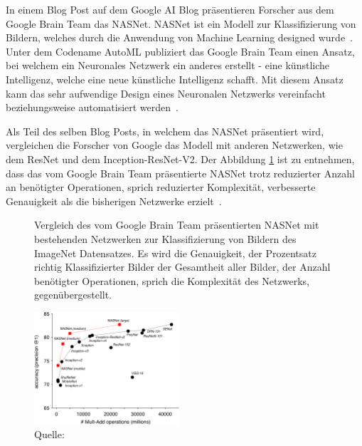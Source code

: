 In einem Blog Post auf dem Google AI Blog präsentieren Forscher aus dem Google Brain Team das NASNet. NASNet ist ein Modell zur Klassifizierung von Bildern, welches durch die Anwendung von Machine Learning designed wurde~\autocite{GoogleNasNet}. Unter dem Codename AutoML publiziert das Google Brain Team einen Ansatz, bei welchem ein Neuronales Netzwerk ein anderes erstellt - eine künstliche Intelligenz, welche eine neue künstliche Intelligenz schafft. Mit diesem Ansatz kann das sehr aufwendige Design eines Neuronalen Netzwerks vereinfacht beziehungsweise automatisiert werden~\autocite{GoogleAutoML}.

Als Teil des selben Blog Posts, in welchem das NASNet präsentiert wird, vergleichen die Forscher von Google das Modell mit anderen Netzwerken, wie dem ResNet und dem Inception-ResNet-V2. Der Abbildung \ref{nasnet-comparision} ist zu entnehmen, dass das vom Google Brain Team präsentierte NASNet trotz reduzierter Anzahl an benötigter Operationen, sprich reduzierter Komplexität, verbesserte Genauigkeit als die bisherigen Netzwerke erzielt~\autocite{GoogleNasNet}.

\begin{figure} 
    \caption{Vergleich des vom Google Brain Team präsentierten NASNet mit bestehenden Netzwerken zur Klassifizierung von Bildern des ImageNet Datensatzes. Es wird die Genauigkeit, der Prozentsatz richtig Klassifizierter Bilder der Gesamtheit aller Bilder, der Anzahl benötigter Operationen, sprich die Komplexität des Netzwerks, gegenübergestellt.}
    \label{nasnet-comparision}
    \centering
    \includegraphics[width=0.48\textwidth]{graphics/nasnet-comparision.jpg}
    \caption*{Quelle: \textcite{GoogleNasNet}}
\end{figure}


